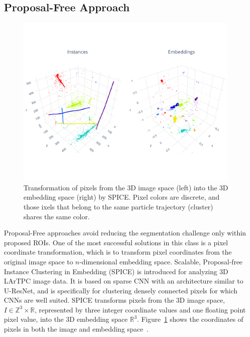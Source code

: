 \documentclass{ws-rv9x6}
\begin{document}
\subsection{Proposal-Free Approach} 
\begin{figure}[t]
    \centering
    \includegraphics[width=0.98\textwidth,trim=0cm 3cm 0cm 3cm, clip]{figures/prediction_24.pdf}
    \caption{Transformation of pixels from the 3D image space (left) into the 3D embedding space (right) by SPICE. Pixel colors are discrete, and those ixels that belong to the same particle trajectory (cluster) shares the same color. }
    \label{fig:clustering:spice_embedding}
\end{figure}
Proposal-Free approaches avoid reducing the segmentation challenge only within proposed ROIs. One of the most successful solutions in this class is a pixel coordinate transformation, which is to transform pixel coordinates from the original image space to $n$-dimensional embedding space. Scalable, Proposal-free Instance Clustering in Embedding (SPICE) is introduced for analyzing 3D LArTPC image data. It is based on sparse CNN with an architecture similar to U-ResNet, and is specifically for clustering densely connected pixels for which CNNs are well suited. SPICE transforms pixels from the 3D image space, $I\in\mathbb{Z}^3\times\mathbb{R}$, represented by three integer coordinate values and one floating point pixel value, into the 3D embedding space $\mathbb{R}^3$. Figure~\ref{fig:clustering:spice_embedding} shows the coordinates of pixels in both the image and embedding space~\cite{koh2020scalable}.
\end{document}
